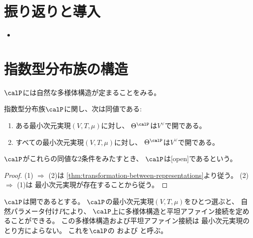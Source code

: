 \documentclass[report]{jlreq}
\begin{document}
%

%
\section*{振り返りと導入}

\begin{itemize}
    \item \TODO{}
\end{itemize}

%
\section{指数型分布族の構造}

$\calP$には自然な多様体構造が定まることをみる。

\begin{propdef}
    指数型分布族$\calP$に関し、次は同値である:
    \begin{enumerate}
        \item ある最小次元実現$(V, T, \mu)$に対し、
            $\Theta^\calP$は$V^\vee$で開である。
        \item すべての最小次元実現$(V, T, \mu)$に対し、
            $\Theta^\calP$は$V^\vee$で開である。
    \end{enumerate}
    $\calP$がこれらの同値な2条件をみたすとき、
    $\calP$は[open]であるという。
\end{propdef}

\begin{proof}
    (1) $\Rightarrow$ (2)は
    \cref{thm:transformation-between-representations}より従う。
    (2) $\Rightarrow$ (1)は
    最小次元実現が存在することから従う。
\end{proof}

\begin{propdef}
    $\calP$は開であるとする。
    $\calP$の最小次元実現$(V, T, \mu)$をひとつ選ぶと、
    自然パラメータ付け$P$により、
    $\calP$上に多様体構造と平坦アファイン接続を定めることができる。
    この多様体構造および平坦アファイン接続は
    最小次元実現のとり方によらない。
    これを$\calP$の
    および
    と呼ぶ。
\end{propdef}
\end{document}
